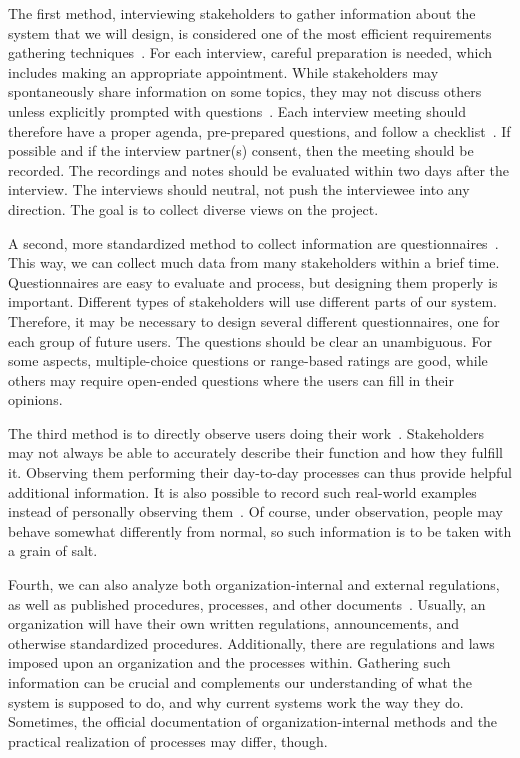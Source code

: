 The first method, interviewing stakeholders to gather information about the system that we will design, is considered one of the most efficient requirements gathering techniques~\cite{DTHJM2006EORETERDFASR,Z2003RDARS}.
For each interview, careful preparation is needed, which includes making an appropriate appointment.
While stakeholders may spontaneously share information on some topics, they may not discuss others unless explicitly prompted with questions~\cite{BJF2014WSWOWNSATAESOTIIREEI}.
Each interview meeting should therefore have a proper agenda, pre-prepared questions, and follow a checklist~\cite{WSEG2016ETIOAKOSTCORQQ}.
If possible and if the interview partner(s) consent, then the meeting should be recorded.
The recordings and notes should be evaluated within two days after the interview.
The interviews should neutral, not push the interviewee into any direction.
The goal is to collect diverse views on the project.

A second, more standardized method to collect information are questionnaires~\cite{TAE2008ISRTDQTSTDQSSAE,Z2003RDARS}.
This way, we can collect much data from many stakeholders within a brief time.
Questionnaires are easy to evaluate and process, but designing them properly is important.
Different types of stakeholders will use different parts of our system.
Therefore, it may be necessary to design several different questionnaires, one for each group of future users.
The questions should be clear an unambiguous.
For some aspects, multiple-choice questions or range-based ratings are good, while others may require open-ended questions where the users can fill in their opinions.

The third method is to directly observe users doing their work~\cite{SGGM2007TMSPATFISRDWS,Z2003RDARS}.
Stakeholders may not always be able to accurately describe their function and how they fulfill it.
Observing them performing their day-to-day processes can thus provide helpful additional information.
It is also possible to record such real-world examples instead of personally observing them~\cite{HPW1998REAVWRWS}.
Of course, under observation, people may behave somewhat differently from normal, so such information is to be taken with a grain of salt.

Fourth, we can also analyze both organization-internal and external regulations, as well as published procedures, processes, and other documents~\cite{RGJ2023EASARBFSAR,Z2003RDARS}.
Usually, an organization will have their own written regulations, announcements, and otherwise standardized procedures.
Additionally, there are regulations and laws imposed upon an organization and the processes within.
Gathering such information can be crucial and complements our understanding of what the system is supposed to do, and why current systems work the way they do.
Sometimes, the official documentation of organization-internal methods and the practical realization of processes may differ, though.

